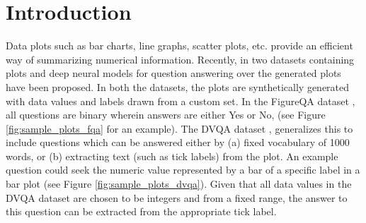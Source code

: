 \documentclass[10pt,twocolumn,letterpaper]{article}
\begin{document}
\section{Introduction}

Data plots such as bar charts, line graphs, scatter plots, etc. provide an efficient way of summarizing numerical information. 
Recently, in \cite{FQA, DVQA} two datasets containing plots and deep neural models for question answering over the generated plots have been proposed. In both the datasets, the plots are synthetically generated with data values and labels drawn from a custom set. In the FigureQA dataset \cite{FQA}, all questions are binary wherein answers are either Yes or No, (see Figure \ref{fig:sample_plots_fqa} for an example).  The DVQA dataset \cite{DVQA}, generalizes this to include questions which can be answered either by (a) fixed vocabulary of 1000 words, or (b) extracting text (such as tick labels) from the plot.  An example question could seek the numeric value represented by a bar of a specific label in a bar plot (see Figure \ref{fig:sample_plots_dvqa}).  Given that all data values in the DVQA dataset are chosen to be integers and from a fixed range, the answer to this question can be extracted from the appropriate tick label. 
\end{document}
